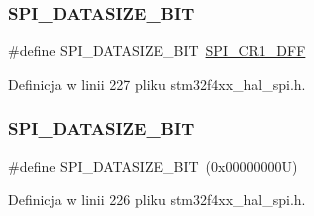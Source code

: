 \subsubsection{\texorpdfstring{S\+P\+I\+\_\+\+D\+A\+T\+A\+S\+I\+Z\+E\+\_\+B\+IT}{SPI\_DATASIZE\_16BIT}}
{\footnotesize\ttfamily \#define S\+P\+I\+\_\+\+D\+A\+T\+A\+S\+I\+Z\+E\+\_\+B\+IT~\hyperlink{group___peripheral___registers___bits___definition_ga3ffabea0de695a19198d906bf6a1d9fd}{S\+P\+I\+\_\+\+C\+R1\+\_\+\+D\+FF}}



Definicja w linii 227 pliku stm32f4xx\+\_\+hal\+\_\+spi.\+h.

\mbox{\label{group___s_p_i___data___size_ga773e9fc5d44c9661c829361fbd073152}} 
\subsubsection{\texorpdfstring{S\+P\+I\+\_\+\+D\+A\+T\+A\+S\+I\+Z\+E\+\_\+B\+IT}{SPI\_DATASIZE\_8BIT}}
{\footnotesize\ttfamily \#define S\+P\+I\+\_\+\+D\+A\+T\+A\+S\+I\+Z\+E\+\_\+B\+IT~(0x00000000\+U)}



Definicja w linii 226 pliku stm32f4xx\+\_\+hal\+\_\+spi.\+h.

